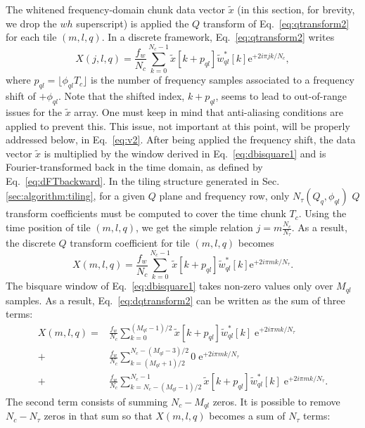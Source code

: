 The whitened frequency-domain chunk data vector $\tilde{x}$ (in this section, for brevity, we drop the $wh$ superscript) is applied the $Q$ transform of Eq.~\ref{eq:qtransform2} for each tile $(m, l, q)$. In a discrete framework, Eq.~\ref{eq:qtransform2} writes
\begin{equation}
  X(j,l,q)=\frac{f_w}{N_c}\sum_{k=0}^{N_c-1}{\tilde{x}[k+p_{ql}]\tilde{w}_{ql}^*[k]\mathrm{e}^{+2i\pi jk/N_c}},
  \label{eq:dqtransform1}
\end{equation}
where $p_{ql}=\lfloor \phi_{ql}T_c \rfloor$ is the number of frequency samples associated to a frequency shift of $+\phi_{ql}$. Note that the shifted index, $k+p_{ql}$, seems to lead to out-of-range issues for the $\tilde{x}$ array. One must keep in mind that anti-aliasing conditions are applied to prevent this. This issue, not important at this point, will be properly addressed below, in Eq.~\ref{eq:v2}. After being applied the frequency shift, the data vector $\tilde{x}$ is multiplied by the window derived in Eq.~\ref{eq:dbisquare1} and is Fourier-transformed back in the time domain, as defined by Eq.~\ref{eq:dFTbackward}. In the tiling structure generated in Sec.\ref{sec:algorithm:tiling}, for a given $Q$ plane and frequency row, only $N_\tau(Q_q, \phi_{ql})$ $Q$ transform coefficients must be computed to cover the time chunk $T_c$. Using the time position of tile $(m,l,q)$, we get the simple relation $j=m\frac{N_c}{N_\tau}$. As a result, the discrete $Q$ transform coefficient for tile $(m,l,q)$ becomes
\begin{equation}
  X(m, l, q) = \frac{f_w}{N_c}\sum_{k=0}^{N_c-1}{\tilde{x}[k+p_{ql}]\tilde{w}_{ql}^*[k]\mathrm{e}^{+2i\pi mk/N_\tau}}.
  \label{eq:dqtransform2}
\end{equation}
The bisquare window of Eq.~\ref{eq:dbisquare1} takes non-zero values only over $M_{ql}$ samples. As a result, Eq.~\ref{eq:dqtransform2} can be written as the sum of three terms:
\begin{align}
  X(m, l, q)
  = & \frac{f_w}{N_c} \sum_{k=0}^{(M_{ql}-1)/2}{\tilde{x}[k+p_{ql}]\tilde{w}_{ql}^*[k] \; \mathrm{e}^{+2i\pi mk/N_\tau}} \\
  + & \frac{f_w}{N_c} \sum_{k=(M_{ql}+1)/2}^{N_c-(M_{ql}-3)/2}{0 \; \mathrm{e}^{+2i\pi mk/N_\tau}} \\
  + & \frac{f_w}{N_c} \sum_{k=N_c-(M_{ql}-1)/2}^{N_c-1}{\tilde{x}[k+p_{ql}]\tilde{w}_{ql}^*[k] \; \mathrm{e}^{+2i\pi mk/N_\tau}} .
  \label{eq:dqtransform3}
\end{align}
The second term consists of summing $N_c-M_{ql}$ zeros. It is possible to remove $N_c-N_\tau$ zeros in that sum so that $X(m,l,q)$ becomes a sum of $N_\tau$ terms:
